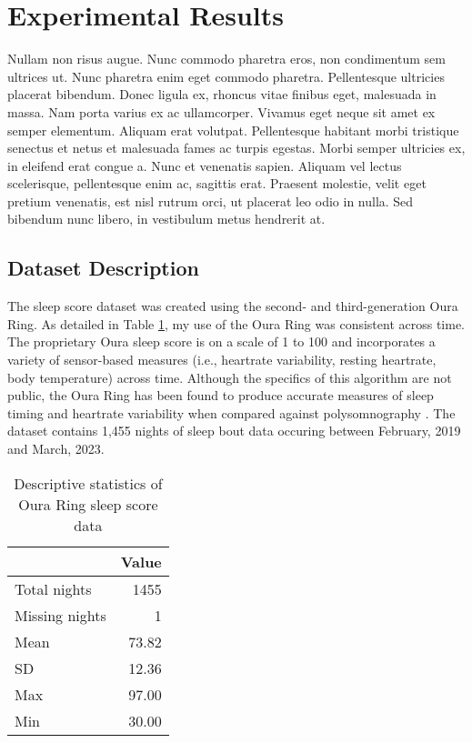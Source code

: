 \documentclass{article}
\begin{document}
\hypertarget{results}{%
\section{Experimental Results}\label{results}}

Nullam non risus augue. Nunc commodo pharetra eros, non condimentum sem
ultrices ut. Nunc pharetra enim eget commodo pharetra. Pellentesque
ultricies placerat bibendum. Donec ligula ex, rhoncus vitae finibus
eget, malesuada in massa. Nam porta varius ex ac ullamcorper. Vivamus
eget neque sit amet ex semper elementum. Aliquam erat volutpat.
Pellentesque habitant morbi tristique senectus et netus et malesuada
fames ac turpis egestas. Morbi semper ultricies ex, in eleifend erat
congue a. Nunc et venenatis sapien. Aliquam vel lectus scelerisque,
pellentesque enim ac, sagittis erat. Praesent molestie, velit eget
pretium venenatis, est nisl rutrum orci, ut placerat leo odio in nulla.
Sed bibendum nunc libero, in vestibulum metus hendrerit at.

\hypertarget{dataset-description}{%
\subsection{Dataset Description}\label{dataset-description}}

The sleep score dataset was created using the second- and third-generation Oura
Ring. As detailed in Table \ref{Sleep}, my use of the Oura Ring was consistent across
time. The proprietary Oura sleep score is on a scale of 1 to 100 and
incorporates a variety of sensor-based measures (i.e., heartrate variability,
resting heartrate, body temperature) across time. Although the specifics of this
algorithm are not public, the Oura Ring has been found to produce
accurate measures of sleep timing and heartrate variability when compared
against polysomnography \citep{dezambottiSleep2019}. The dataset contains 1,455
nights of sleep bout data occuring between February, 2019 and March, 2023.

\begin{table}[ht]
  \centering
  \begin{tabular}{lr}
  \toprule
     & \textbf{Value}\\ \midrule
      Total nights & 1455 \\
      Missing nights & 1 \\
      Mean & 73.82 \\
      SD & 12.36 \\
      Max & 97.00 \\
      Min & 30.00 \\
   \bottomrule
  \end{tabular}
\caption{Descriptive statistics of Oura Ring sleep score data}
\label{Sleep}
\end{table}
\end{document}

